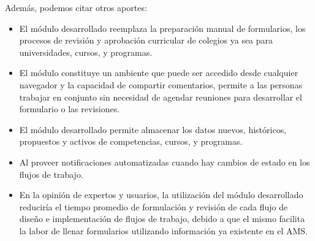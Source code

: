 Además, podemos citar otros aportes:
\begin{itemize}
	\item El módulo desarrollado reemplaza la preparación manual de formularios, los procesos de revisión y aprobación curricular de colegios ya sea para universidades, cursos, y programas.
	\item El módulo constituye un ambiente que puede ser accedido desde cualquier navegador y la capacidad de compartir comentarios, permite a las personas trabajar en conjunto sin necesidad de agendar reuniones para desarrollar el formulario o las revisiones.
	\item El módulo desarrollado permite almacenar los datos nuevos, históricos, propuestos y activos de competencias, cursos, y programas.
	\item Al proveer notificaciones automatizadas cuando hay cambios de estado en los flujos de trabajo.
	\item En la opinión de expertos y usuarios, la utilización del módulo desarrollado reduciría el tiempo promedio de formulación y revisión de cada flujo de diseño e implementación de flujos de trabajo, debido a que el mismo facilita la labor de llenar formularios utilizando información ya existente en el AMS.
\end{itemize}

